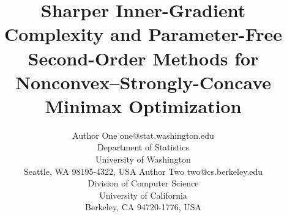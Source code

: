 \title{Sharper Inner-Gradient Complexity and Parameter-Free Second-Order Methods for Nonconvex–Strongly-Concave Minimax Optimization}

\author{\name Author One \email one@stat.washington.edu \\
       \addr Department of Statistics\\
       University of Washington\\
       Seattle, WA 98195-4322, USA
       \AND
       \name Author Two \email two@cs.berkeley.edu \\
       \addr Division of Computer Science\\
       University of California\\
       Berkeley, CA 94720-1776, USA}


\maketitle
